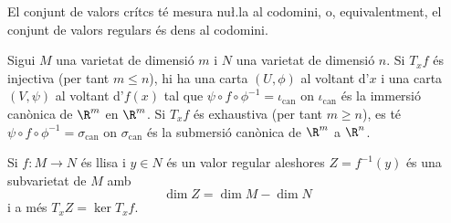 \documentclass[12pt,twocolumn]{article}
\begin{document}
\begin{theorem}[Sard]
	El conjunt de valors crítcs té mesura nu\l.la al codomini, o, equivalentment, el conjunt
	de valors regulars és dens al codomini. 
\end{theorem}

\begin{theorem} 
	Sigui \( M \) una varietat de dimensió \( m \) i \( N \) una varietat de dimensió \( n
	\). Si \( T_xf \) és injectiva (per tant \( m \leq n \)), hi ha una carta \( (U,\phi) \)
	al voltant d'\( x \) i una carta \( (V,\psi) \) al voltant d'\( f(x) \) tal que \( \psi
	\circ f \circ \phi^{-1} = \iota_\mathrm{can} \) on \( \iota_\mathrm{can} \) és la
	immersió canònica de \( \R^m \) en \( \R^m \). Si \( T_xf \) és exhaustiva (per tant \(
	m \geq n \)), es té \( \psi \circ f \circ \phi^{-1} = \sigma_\mathrm{can} \) on \(
	\sigma_\mathrm{can} \) és la submersió canònica de \( \R^m \) a \( \R^n \).
\end{theorem}

\begin{theorem}
	Si \( f \colon M \to N \) és llisa i \( y \in N \) és un valor regular aleshores \(
	Z = f^{-1}(y) \) és una subvarietat de \( M \) amb
	\begin{equation*}
		\dim Z = \dim M - \dim N
	\end{equation*}
	i a més \( T_x Z = \ker T_xf \).
\end{theorem}
\end{document}
